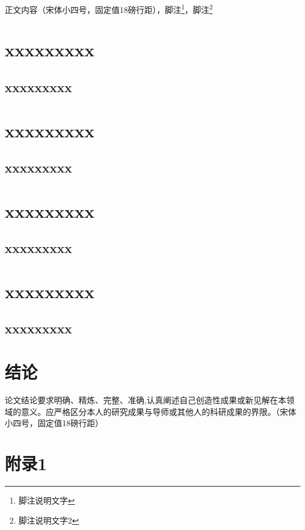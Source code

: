 \documentclass[doctor]{fnuthesis}
\begin{document}
正文内容（宋体小四号，固定值18磅行距），脚注\footnote{脚注说明文字}，脚注\footnote{脚注说明文字2}

\chapter{xxxxxxxxx}

\section{xxxxxxxxx}

\chapter{xxxxxxxxx}

\section{xxxxxxxxx}

\chapter{xxxxxxxxx}

\section{xxxxxxxxx}

\chapter{xxxxxxxxx}

\section{xxxxxxxxx}

\chapter{结论}

论文结论要求明确、精炼、完整、准确,认真阐述自己创造性成果或新见解在本领域的意义。应严格区分本人的研究成果与导师或其他人的科研成果的界限。（宋体小四号，固定值18磅行距）

\backmatter

\chapter{附录1}
\end{document}

